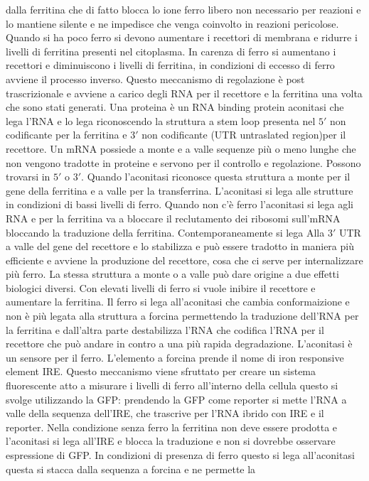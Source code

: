 dalla ferritina che di fatto blocca lo ione ferro libero non necessario per reazioni e lo mantiene silente e ne impedisce che venga coinvolto in reazioni pericolose. Quando si ha poco
ferro si devono aumentare i recettori di membrana e ridurre i livelli di ferritina presenti nel citoplasma. In carenza di ferro si aumentano i recettori e diminuiscono i livelli di 
ferritina, in condizioni di eccesso di ferro avviene il processo inverso. Questo meccanismo di regolazione  \`e post trascrizionale e avviene a carico degli RNA per il recettore e la
ferritina una volta che sono stati generati. Una proteina \`e un RNA binding protein aconitasi che lega l'RNA e lo lega riconoscendo la struttura a stem loop presenta nel $5'$ non 
codificante per la ferritina e $3'$ non codificante (UTR untraslated region)per il recettore. Un mRNA possiede a monte e a valle sequenze pi\`u o meno lunghe che non vengono tradotte in
proteine e servono per il controllo e regolazione. Possono trovarsi in $5'$ o $3'$. Quando l'aconitasi riconosce questa struttura a monte per il gene della ferritina e a valle per la
transferrina. L'aconitasi si lega alle strutture in condizioni di bassi livelli di ferro. Quando non c'\`e ferro l'aconitasi si lega agli RNA e per la ferritina va a bloccare il 
reclutamento dei ribosomi sull'mRNA bloccando la traduzione della ferritina. Contemporaneamente si lega Alla $3'$ UTR a valle del gene del recettore e lo stabilizza e pu\`o essere 
tradotto in maniera pi\`u efficiente e avviene la produzione del recettore, cosa che ci serve per internalizzare pi\`u ferro. La stessa struttura a monte o a valle pu\`o dare origine a 
due effetti biologici diversi. Con elevati livelli di ferro si vuole inibire il recettore e aumentare la ferritina. Il ferro si lega all'aconitasi che cambia conformaizione e non \`e
pi\`u legata alla struttura a forcina permettendo la traduzione dell'RNA per la ferritina e dall'altra parte destabilizza l'RNA che codifica l'RNA per il recettore che pu\`o andare in
contro a una pi\`u rapida degradazione. L'aconitasi \`e un sensore per il ferro. L'elemento a forcina prende il nome di iron responsive element IRE. Questo meccanismo viene sfruttato per
creare un sistema fluorescente atto a misurare i livelli di ferro all'interno della cellula questo si svolge utilizzando la GFP: prendendo la GFP come reporter si mette l'RNA a valle
della sequenza dell'IRE, che trascrive per l'RNA ibrido con IRE e il reporter. Nella condizione senza ferro la ferritina non deve essere prodotta e l'aconitasi si lega all'IRE e blocca
la traduzione e non si dovrebbe osservare espressione di GFP. In condizioni di presenza di ferro questo si lega all'aconitasi questa si stacca dalla sequenza a forcina e ne permette la

